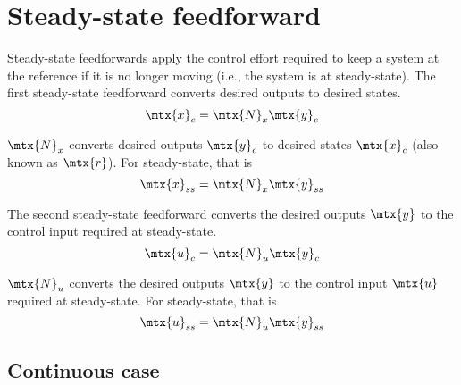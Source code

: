 
\chapter{Steady-state feedforward}

Steady-state feedforwards apply the \gls{control effort} required to keep a
\gls{system} at the \gls{reference} if it is no longer moving (i.e., the
\gls{system} is at steady-state). The first steady-state feedforward converts
desired \glspl{output} to desired \glspl{state}.
\begin{equation*}
  \mtx{x}_c = \mtx{N}_x\mtx{y}_c
\end{equation*}

$\mtx{N}_x$ converts desired \glspl{output} $\mtx{y}_c$ to desired \glspl{state}
$\mtx{x}_c$ (also known as $\mtx{r}$). For steady-state, that is
\begin{equation}
  \mtx{x}_{ss} = \mtx{N}_x\mtx{y}_{ss} \label{eq:x_ss}
\end{equation}

The second steady-state feedforward converts the desired \glspl{output}
$\mtx{y}$ to the \gls{control input} required at steady-state.
\begin{equation*}
  \mtx{u}_c = \mtx{N}_u\mtx{y}_c
\end{equation*}

$\mtx{N}_u$ converts the desired \glspl{output} $\mtx{y}$ to the
\gls{control input} $\mtx{u}$ required at steady-state. For steady-state, that
is
\begin{equation}
  \mtx{u}_{ss} = \mtx{N}_u\mtx{y}_{ss} \label{eq:u_ss}
\end{equation}

\section{Continuous case}

